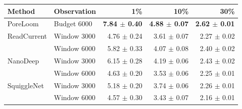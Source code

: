 \begingroup\setlength{\tabcolsep}{3.5pt}
\begin{tabular}{@{}llrrr@{}}\toprule
Method & Observation & 1\% & 10\% & 30\%\\\midrule
PoreLoom & Budget 6000 & \textbf{7.84 $\pm$ 0.40} & \textbf{4.88 $\pm$ 0.07} & \textbf{2.62 $\pm$ 0.01}\\
ReadCurrent & Window 3000 & 4.76 $\pm$ 0.24 & 3.61 $\pm$ 0.07 & 2.27 $\pm$ 0.02\\
 & Window 6000 & 5.82 $\pm$ 0.33 & 4.07 $\pm$ 0.08 & 2.40 $\pm$ 0.02\\
NanoDeep & Window 3000 & 6.15 $\pm$ 0.28 & 4.19 $\pm$ 0.06 & 2.43 $\pm$ 0.02\\
 & Window 6000 & 4.63 $\pm$ 0.20 & 3.53 $\pm$ 0.06 & 2.25 $\pm$ 0.01\\
SquiggleNet & Window 3000 & 5.18 $\pm$ 0.20 & 3.74 $\pm$ 0.06 & 2.26 $\pm$ 0.01\\
 & Window 6000 & 4.57 $\pm$ 0.30 & 3.43 $\pm$ 0.07 & 2.16 $\pm$ 0.01\\
\bottomrule\end{tabular}\endgroup

